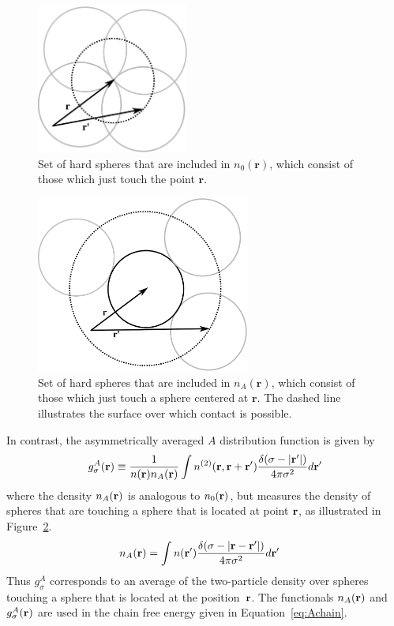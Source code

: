 \begin{figure}
\begin{center}
\includegraphics[width=5cm]{figs/n0}
\end{center}
\caption{Set of hard spheres that are included in $n_0(\mathbf{r})$, which
  consist of those which just touch the point $\mathbf{r}$.}
\label{fig:n0}
\end{figure}

\begin{figure}
\begin{center}
\includegraphics[width=7cm]{figs/nA}
\end{center}
\caption{Set of hard spheres that are included in $n_A(\mathbf{r})$,
  which consist of those which just touch a sphere centered at
  $\mathbf{r}$.  The dashed line illustrates the surface over which
  contact is possible.}
\label{fig:nA}
\end{figure}

In contrast, the asymmetrically averaged $A$ distribution function is
given by
\begin{align}
  g^A_\sigma(\textbf{r}) \equiv \frac{1}{n(\textbf{r})n_A(\textbf{r})}
  \int n^{(2)}(\textbf{r}, \textbf{r} + \textbf{r}')
  \frac{\delta(\sigma -|\textbf{r}'|)}{4\pi\sigma^2}d\textbf{r}' \label{eq:gA}
\end{align}
where the density $n_A(\textbf{r})$ is analogous to $n_0(\textbf{r})$, but measures the
density of spheres that are touching a sphere that is located at
point $\textbf{r}$, as illustrated in Figure~\ref{fig:nA}.
\begin{align}
  n_A(\textbf{r}) &= \int n(\textbf{r}')
  \frac{\delta(\sigma -|\textbf{r}-\textbf{r}'|)}{4\pi\sigma^2} d\textbf{r}' \label{eq:nA}
\end{align}
Thus $g_\sigma^A$ corresponds to an average of the two-particle
density over spheres touching a sphere that is located at the
position~$\textbf{r}$.  The functionals $n_A(\textbf{r})$ and $g_\sigma^A(\textbf{r})$ are
used in the chain free energy given in Equation~\ref{eq:Achain}.

